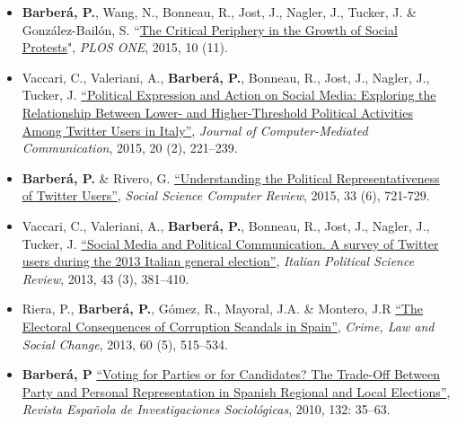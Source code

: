 \documentclass[margin,line,11pt]{resume}
\begin{document}
\begin{resume}
\begin{itemize}[leftmargin=5.5mm]
\item[6.] \textbf{Barber\'{a}, P.}, Wang, N., Bonneau, R., Jost, J., Nagler, J., Tucker, J. \& Gonz\'{a}lez-Bail\'{o}n, S. ``\href{http://journals.plos.org/plosone/article?id=10.1371/journal.pone.0143611}{The Critical Periphery in the Growth of Social Protests}", \textit{PLOS ONE}, 2015, 10 (11).

\item[5.] Vaccari, C., Valeriani, A., \textbf{Barber\'{a}, P.}, Bonneau, R., Jost, J., Nagler, J., Tucker, J. \href{http://onlinelibrary.wiley.com/doi/10.1111/jcc4.12108/abstract#.VLRLl9mdVFM.twitter}{``Political Expression and Action on Social Media: Exploring the Relationship Between Lower- and Higher-Threshold Political Activities Among Twitter Users in Italy''}, \emph{Journal of Computer-Mediated Communication}, 2015, 20 (2), 221--239.

\newpage   

\item[4.] \textbf{Barber\'{a}, P.} \& Rivero, G. \href{http://ssc.sagepub.com/content/33/6/712}{``Understanding the Political Representativeness of Twitter Users''}, \textit{Social Science Computer Review}, 2015, 33 (6), 721-729.

\item[3.] Vaccari, C., Valeriani, A., \textbf{Barber\'{a}, P.}, Bonneau, R., Jost, J., Nagler, J., Tucker, J. \href{http://www.rivisteweb.it/doi/10.1426/75245}{``Social Media and Political Communication. A survey of Twitter users during the 2013 Italian general election''}, \emph{Italian Political Science Review}, 2013, 43 (3), 381--410.

\item[2.] Riera, P., \textbf{Barber\'{a}, P.}, G\'{o}mez, R., Mayoral, J.A. \& Montero, J.R \href{http://link.springer.com/article/10.1007/s10611-013-9479-1}{``The Electoral Consequences of Corruption Scandals in Spain''}, \emph{Crime, Law and Social Change}, 2013, 60 (5), 515--534.

\item[1.] \textbf{Barber\'{a}, P} \href{http://www.reis.cis.es/REIS/PDF/REIS_132_021285919804928.pdf}{``Voting for Parties or for Candidates? The Trade-Off Between Party and Personal Representation in Spanish Regional and Local Elections''}, \emph{Revista Espa\~{n}ola de Investigaciones Sociol\'{o}gicas}, 2010, 132: 35--63.

\end{itemize}    



\end{resume}
\end{document}
